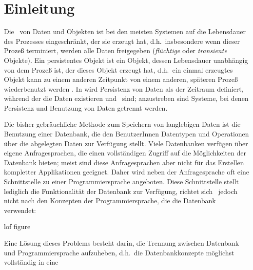 %
\chapter{Einleitung}\label{chap:intro}
%
Die \ von Daten und Objekten ist bei den
meisten Systemen auf die Lebensdauer des Prozesses eingeschr\"{a}nkt, der
sie erzeugt hat, d.h.\ insbesondere wenn dieser Proze\ss{} terminiert,
werden alle Daten freigegeben ({\em fl\"{u}chtige\/} oder
{\em transiente\/} Objekte).  Ein persistentes Objekt ist ein Objekt,
dessen Lebensdauer unabh\"{a}ngig von dem Proze\ss{} ist, der dieses Objekt
erzeugt hat, d.h.\ ein einmal erzeugtes Objekt kann zu einem anderen
Zeitpunkt von einem anderen, sp\"{a}teren Proze\ss{} wiederbenutzt werden
\cite[]{bib:at89}. In \cite[]{bib:mo89a} wird
Persistenz von Daten als der Zeitraum definiert, w\"{a}hrend der die
Daten existieren und \ sind; anzustreben
sind Systeme, bei denen Persistenz und Benutzung von Daten getrennt
werden.
%
\par{}Die bisher gebr\"{a}uchliche Methode zum Speichern von langlebigen
Daten ist die Benutzung einer Datenbank, die den BenutzerInnen
Datentypen und Operationen \"{u}ber die abgelegten Daten zur Verf\"{u}gung
stellt.  Viele Datenbanken verf\"{u}gen \"{u}ber eigene Anfragesprachen, die
einen vollst\"{a}ndigen Zugriff auf die M\"{o}g\-lich\-kei\-ten der
Datenbank bieten; meist sind diese Anfragesprachen aber nicht f\"{u}r das
Erstellen kompletter Applikationen geeignet. Daher wird neben der
Anfragesprache oft eine Schnittstelle zu einer Programmiersprache
angeboten. Diese Schnittstelle stellt lediglich die Funktionalit\"{a}t
der Datenbank zur Verf\"{u}gung, richtet sich \ia\ jedoch nicht nach den
Konzepten der Programmiersprache, die die Datenbank verwendet:%
\footnotemark\addtocounter{footnote}{-1}%
%
\begin{figure}[htbp]%
\ifbuch%
\centerline{}%
\else%
\centerline{}%
\fi%
\end{figure}%
%
\addcontentsline%
 {lof}%
 {figure}%
 {\protect{}}%
%
\par\noindent{}Eine L\"{o}sung dieses Problems besteht darin, die
Trennung zwischen Datenbank und Programmiersprache aufzuheben,
d.h.\ die  Datenbankkonzepte m\"{o}glichst vollst\"{a}ndig in eine
